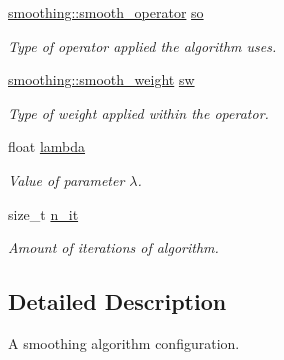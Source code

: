 \begin{DoxyCompactItemize}
\item 
\hyperlink{namespacegeoproc_1_1smoothing_a64c2bfd1dda6cfbf39afa2e61fd62537}{smoothing\+::smooth\+\_\+operator} \hyperlink{structgeoproc_1_1filter__frequencies_1_1smoothing__configuration_af5f701a4b1af506bd9be68e3c5da8d44}{so}
\begin{DoxyCompactList}\small\item\em Type of operator applied the algorithm uses. \end{DoxyCompactList}\item 
\hyperlink{namespacegeoproc_1_1smoothing_a76e43f405426c150569712512de58028}{smoothing\+::smooth\+\_\+weight} \hyperlink{structgeoproc_1_1filter__frequencies_1_1smoothing__configuration_a62aba82705c2fa9308d7e225456be7b7}{sw}
\begin{DoxyCompactList}\small\item\em Type of weight applied within the operator. \end{DoxyCompactList}\item 
\mbox{\label{structgeoproc_1_1filter__frequencies_1_1smoothing__configuration_ad6e8e5ebdd18c3d013e4fbbc3d965dfa}} 
float \hyperlink{structgeoproc_1_1filter__frequencies_1_1smoothing__configuration_ad6e8e5ebdd18c3d013e4fbbc3d965dfa}{lambda}
\begin{DoxyCompactList}\small\item\em Value of parameter $\lambda$. \end{DoxyCompactList}\item 
\mbox{\label{structgeoproc_1_1filter__frequencies_1_1smoothing__configuration_aa9f5a87ca7e0084e9ac6f3c40d30310c}} 
size\+\_\+t \hyperlink{structgeoproc_1_1filter__frequencies_1_1smoothing__configuration_aa9f5a87ca7e0084e9ac6f3c40d30310c}{n\+\_\+it}
\begin{DoxyCompactList}\small\item\em Amount of iterations of algorithm. \end{DoxyCompactList}\end{DoxyCompactItemize}


\subsection{Detailed Description}
A smoothing algorithm configuration. 

